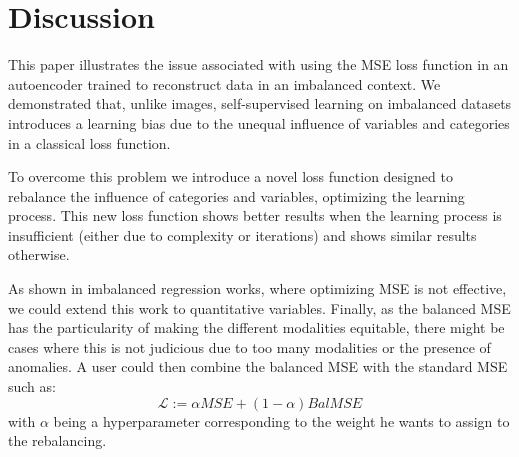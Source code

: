 \documentclass{article}
\theoremstyle{definition}
\begin{document}
\section{Discussion}

This paper illustrates the issue associated with using the MSE loss function in an autoencoder trained to reconstruct data in an imbalanced context. 
We demonstrated that, unlike images, self-supervised learning on imbalanced datasets introduces a learning bias due to the unequal influence of variables and categories in a classical loss function.

To overcome this problem we introduce a novel loss function designed to rebalance the influence of categories and variables, optimizing the learning process. This new loss function shows better results when the learning process is insufficient (either due to complexity or iterations) and shows similar results otherwise.

As shown in imbalanced regression works, where optimizing MSE is not effective, we could extend this work to quantitative variables. Finally, as the balanced MSE has the particularity of making the different modalities equitable, there might be cases where this is not judicious due to too many modalities or the presence of anomalies. A user could then combine the balanced MSE with the standard MSE such as: $$\mathcal{L}:= \alpha MSE + (1-\alpha) BalMSE$$ with $\alpha$ being a hyperparameter corresponding to the weight he wants to assign to the rebalancing. 

\newpage

  
  





%   
\end{document}
